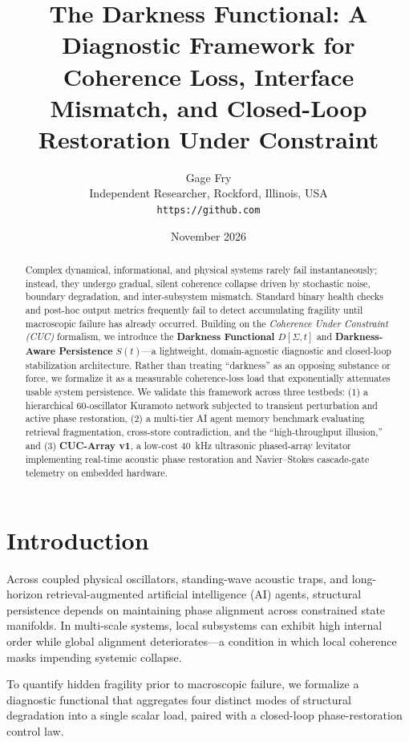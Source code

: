 \documentclass[11pt,twocolumn]{article}
\title{\textbf{The Darkness Functional: A Diagnostic Framework for Coherence Loss, Interface Mismatch, and Closed-Loop Restoration Under Constraint}}
\author{Gage Fry \\ \small Independent Researcher, Rockford, Illinois, USA \\ \small \texttt{https://github.com}}
\date{November 2026}
\begin{document}
\maketitle

\begin{abstract}
Complex dynamical, informational, and physical systems rarely fail instantaneously; instead, they undergo gradual, silent coherence collapse driven by stochastic noise, boundary degradation, and inter-subsystem mismatch. Standard binary health checks and post-hoc output metrics frequently fail to detect accumulating fragility until macroscopic failure has already occurred. Building on the \textit{Coherence Under Constraint (CUC)} formalism, we introduce the \textbf{Darkness Functional} $D[\Sigma, t]$ and \textbf{Darkness-Aware Persistence} $S(t)$—a lightweight, domain-agnostic diagnostic and closed-loop stabilization architecture. Rather than treating ``darkness'' as an opposing substance or force, we formalize it as a measurable coherence-loss load that exponentially attenuates usable system persistence. We validate this framework across three testbeds: (1) a hierarchical 60-oscillator Kuramoto network subjected to transient perturbation and active phase restoration, (2) a multi-tier AI agent memory benchmark evaluating retrieval fragmentation, cross-store contradiction, and the ``high-throughput illusion,'' and (3) \textbf{CUC-Array v1}, a low-cost 40~kHz ultrasonic phased-array levitator implementing real-time acoustic phase restoration and Navier--Stokes cascade-gate telemetry on embedded hardware.
\end{abstract}

\section{Introduction}
Across coupled physical oscillators, standing-wave acoustic traps, and long-horizon retrieval-augmented artificial intelligence (AI) agents, structural persistence depends on maintaining phase alignment across constrained state manifolds. In multi-scale systems, local subsystems can exhibit high internal order while global alignment deteriorates—a condition in which local coherence masks impending systemic collapse.

To quantify hidden fragility prior to macroscopic failure, we formalize a diagnostic functional that aggregates four distinct modes of structural degradation into a single scalar load, paired with a closed-loop phase-restoration control law.
\end{document}
